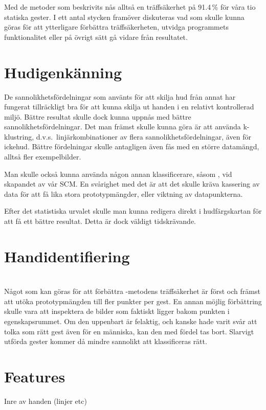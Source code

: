 \documentclass[../rapport_MVEX01-11-05]{subfiles}
\begin{document}
Med de metoder som beskrivits nås alltså en träffsäkerhet på 91.4\,\%
för våra tio statiska gester. I ett antal stycken framöver diskuteras
vad som skulle kunna göras för att ytterligare förbättra
träffsäkerheten, utvidga programmets funktionalitet eller på övrigt
sätt gå vidare från resultatet.

\section{Hudigenkänning}
De sannolikhetsfördelningar som använts för att skilja hud från annat
har fungerat tillräckligt bra för att kunna skilja ut handen i en
relativt kontrollerad miljö. Bättre resultat skulle dock kunna uppnås
med bättre sannolikhetsfördelningar. Det man främst skulle kunna göra
är att använda k-klustring, d.v.s.~linjärkombinationer av flera
sannolikhetsfördelningar, även för ickehud. Bättre fördelningar skulle
antagligen även fås med en större datamängd, alltså fler
exempelbilder.

Man skulle också kunna använda någon annan klassificerare, såsom \knn,
vid skapandet av vår SCM. En svårighet med det är att det skulle
kräva kassering av data för att få lika stora prototypmängder,
eller viktning av datapunkterna.

Efter det statistiska urvalet skulle man kunna redigera direkt i
hudfärgskartan för att få ett bättre resultat. Detta är dock väldigt
tidskrävande.

\section{Handidentifiering}

\section{\knn}
Något som kan göras för att förbättra \knn-metodens träffsäkerhet är först och
främst att utöka prototypmängden till fler punkter per gest. En annan möjlig
förbättring skulle vara att inspektera de bilder som faktiskt ligger bakom
punkten i egenskapsrummet. Om den uppenbart är felaktig, och kanske hade varit
svår att tolka som rätt gest även för en människa, kan den med fördel tas bort.
Slarvigt utförda gester kommer då mindre sannolikt att
klassificeras rätt.

\section{Features}
Inre av handen (linjer etc)
\end{document}
